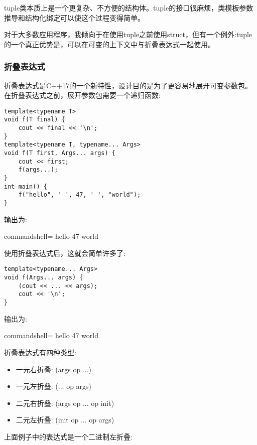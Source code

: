
tuple类本质上是一个更复杂、不方便的结构体。tuple的接口很麻烦，类模板参数推导和结构化绑定可以使这个过程变得简单。

对于大多数应用程序，我倾向于在使用tuple之前使用struct，但有一个例外:tuple的一个真正优势是，可以在可变的上下文中与折叠表达式一起使用。

\subsubsection{折叠表达式}

折叠表达式是C++17的一个新特性，设计目的是为了更容易地展开可变参数包。在折叠表达式之前，展开参数包需要一个递归函数:

\begin{lstlisting}[style=styleCXX]
template<typename T>
void f(T final) {
	cout << final << '\n';
}
template<typename T, typename... Args>
void f(T first, Args... args) {
	cout << first;
	f(args...);
}
int main() {
	f("hello", ' ', 47, ' ', "world");
}
\end{lstlisting}

输出为:

\begin{tcblisting}{commandshell={}}
hello 47 world
\end{tcblisting}

使用折叠表达式后，这就会简单许多了:

\begin{lstlisting}[style=styleCXX]
template<typename... Args>
void f(Args... args) {
	(cout << ... << args);
	cout << '\n';
}
\end{lstlisting}

输出为:

\begin{tcblisting}{commandshell={}}
hello 47 world
\end{tcblisting}

折叠表达式有四种类型:

\begin{itemize}
\item 
一元右折叠: (args op ...)

\item 
一元左折叠: (... op args)

\item 
二元右折叠: (args op ... op init)

\item 
二元左折叠: (init op ... op args)
\end{itemize}

上面例子中的表达式是一个二进制左折叠:


